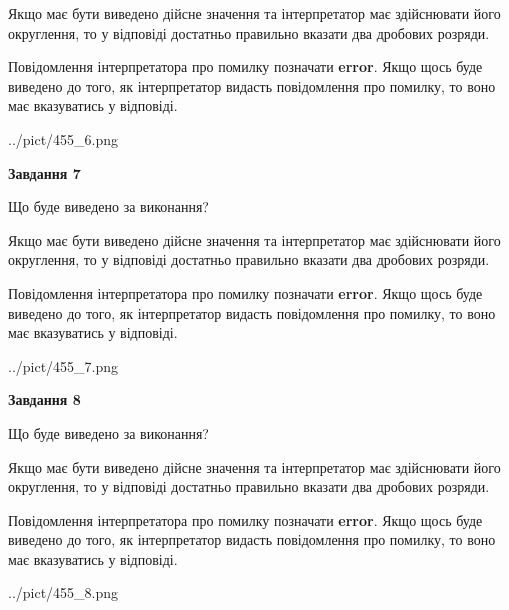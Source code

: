 \documentclass[12pt, ukrainian]{article}
\begin{document}
{\begin {Large}
Якщо має бути виведено дійсне значення та інтерпретатор має здійснювати його округлення, 
то у відповіді достатньо правильно вказати два дробових розряди.

Повідомлення інтерпретатора про помилку позначати \textbf{error}.
Якщо щось буде виведено до того, як інтерпретатор видасть повідомлення про помилку, 
то воно має вказуватись у відповіді. \par

\begin{center}
	{../pict/455_6.png}
\end{center}
\newpage

{\begin {center}\textbf{Завдання 7}\end {center}}\par
Що буде виведено за виконання? \par

Якщо має бути виведено дійсне значення та інтерпретатор має здійснювати його округлення, 
то у відповіді достатньо правильно вказати два дробових розряди.

Повідомлення інтерпретатора про помилку позначати \textbf{error}.
Якщо щось буде виведено до того, як інтерпретатор видасть повідомлення про помилку, 
то воно має вказуватись у відповіді. \par

\begin{center}
	{../pict/455_7.png}
\end{center}
\newpage

{\begin {center}\textbf{Завдання 8}\end {center}}\par
Що буде виведено за виконання? \par

Якщо має бути виведено дійсне значення та інтерпретатор має здійснювати його округлення, 
то у відповіді достатньо правильно вказати два дробових розряди.

Повідомлення інтерпретатора про помилку позначати \textbf{error}.
Якщо щось буде виведено до того, як інтерпретатор видасть повідомлення про помилку, 
то воно має вказуватись у відповіді. \par

\begin{center}
	{../pict/455_8.png}
\end{center}
\newpage


\end{Large}}
\end{document}
